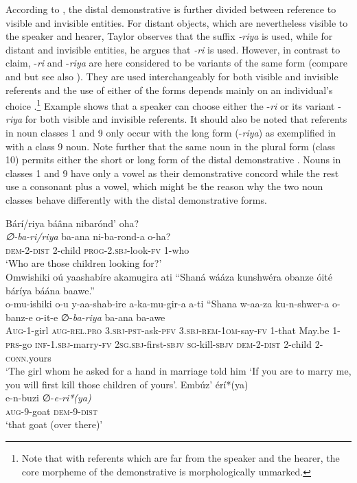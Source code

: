 \documentclass[output=paper 		  ]{langscibook}
\begin{document}
According to \citet[135]{Taylor1985}, the distal demonstrative is further divided between reference to visible and invisible entities. For distant objects, which are nevertheless visible to the speaker and hearer, Taylor observes that the suffix \emph{{}-}\textit{riya} is used, while for distant and invisible entities, he argues that \textit{{}-ri} is used. However, in contrast to  claim, -\textit{ri} and -\textit{riya} are here considered to be variants of the same form (compare  and  but see also ). They are used interchangeably for both visible and invisible referents and the use of either of the forms depends mainly on an individual’s choice \citep{Asiimwe2014}.\footnote{Note that with referents which are far from the speaker and the hearer, the core morpheme of the demonstrative is morphologically unmarked.} Example  shows that a speaker can choose either the -\textit{ri} or its variant -\textit{riya} for both visible and invisible referents. It should also be noted that referents in noun classes 1 and 9 only occur with the long form (-\textit{riya}) as exemplified in  with a class 9 noun. Note further that the same noun in the plural form (class 10) permits either the short or long form of the distal demonstrative . Nouns in classes 1 and 9 have only a vowel as their demonstrative concord while the rest use a consonant plus a vowel, which might be the reason why the two noun classes behave differently with the distal demonstrative forms.

\ea%
    \label{ex:asiimwe:15}
    Bárí/riya báâna nibarónd’ oha?\\
  \gll \emph{∅{}-ba-ri/riya}  ba-ana  ni-ba-rond-a  o-ha?\\
  \textsc{dem-}2-\textsc{dist}  2-child  \textsc{prog-2.sbj}{}-look-\textsc{fv}  1-who\\
  \glt ‘Who are those children looking for?’
\ex%
    \label{ex:asiimwe:16} \citet[184]{Asiimwe2014}\\
     Omwishiki oú yaashabíre akamugira ati “Shaná wááza kunshwéra obanze óité báríya báána baawe.”  \citep[20]{Karwemera1975}\\
  \gll o-mu-ishiki  o-u  y-aa-shab-ire  a-ka-mu-gir-a  a-ti  “Shana w-aa-za  ku-n-shwer-a  o-banz-e  o-it-e  ∅{}-\emph{ba-riya}  ba-ana  ba-awe \\
\textsc{Aug}{}-1-girl  \textsc{aug-rel.pro}  \textsc{3.sbj-pst}{}-ask-\textsc{pfv}  \textsc{3.sbj-rem}{}-\textsc{1om}{}-say-\textsc{fv}  1-that  May.be 1-\textsc{prs}{}-go  \textsc{inf-1.sbj}{}-marry-\textsc{fv}  \textsc{2sg.sbj}{}-first-\textsc{sbjv}  \textsc{sg}{}-kill-\textsc{sbjv}  \textsc{dem-2-dist}  2-child  2-\textsc{conn}.yours\\
    \glt ‘The girl whom he asked for a hand in marriage told him ‘If you are to marry me, you will first kill those children of yours’.
\ex%
    \label{ex:asiimwe:17}
    \ea\label{ex:asiimwe:17a}  Embúz’ érí*(ya)\\
    \gll e-n-buzi   ∅{}-\emph{e-ri*(ya)}\\
    \textsc{aug-}9-goat  \textsc{dem-}9-\textsc{dist}\\
    \glt ‘that goat (over there)’
\end{document}
